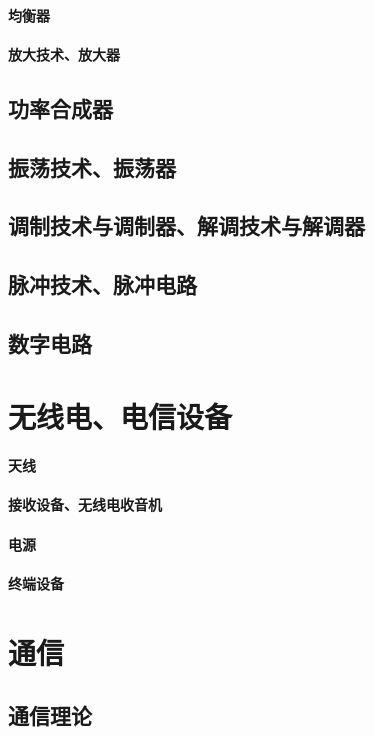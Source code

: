 \documentclass[UTF8]{../../ApplicationUniverse}
\begin{document}
    \subsubsection{均衡器}
    \subsubsection{放大技术、放大器}
\section{功率合成器}
\section{振荡技术、振荡器}
\section{调制技术与调制器、解调技术与解调器}
\section{脉冲技术、脉冲电路}
\section{数字电路}
\chapter{无线电、电信设备}
    \subsubsection{天线}
    \subsubsection{接收设备、无线电收音机}
    \subsubsection{电源}
    \subsubsection{终端设备}




\chapter{通信}
\section{通信理论}
\end{document}
